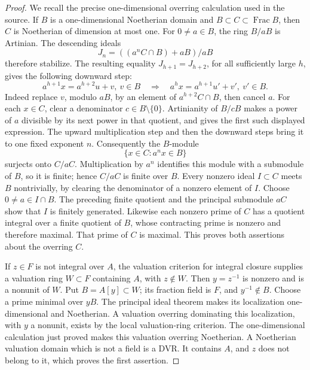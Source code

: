 \begin{proof}
We recall the precise one-dimensional overring calculation
used in the source.
If \(B\) is a one-dimensional Noetherian domain and
\(B\subset C\subset\operatorname{Frac}B\), then \(C\) is
Noetherian of dimension at most one.
For \(0\ne a\in B\), the ring \(B/aB\) is Artinian.
The descending ideals
\[
                    J_n=((a^nC\cap B)+aB)/aB
\]
therefore stabilize.
The resulting equality \(J_{h+1}=J_{h+2}\), for all
sufficiently large \(h\), gives the following downward
step:
\[
 a^{h+1}x=a^{h+2}u+v,\ v\in B
       \quad\Longrightarrow\quad
 a^hx=a^{h+1}u'+v',\ v'\in B.
\]
Indeed replace \(v\), modulo \(aB\), by an element of
\(a^{h+2}C\cap B\), then cancel \(a\).
For each \(x\in C\), clear a denominator \(c\in B\setminus\{0\}\).
Artinianity of \(B/cB\) makes a power of \(a\) divisible
by its next power in that quotient, and gives the first
such displayed expression.
The upward multiplication step and then the downward
steps bring it to one fixed exponent \(n\).
Consequently the \(B\)-module
\[
                        \{x\in C:a^nx\in B\}
\]
surjects onto \(C/aC\).
Multiplication by \(a^n\) identifies this module with a
submodule of \(B\), so it is finite; hence \(C/aC\) is
finite over \(B\).
Every nonzero ideal \(I\subset C\) meets \(B\) nontrivially,
by clearing the denominator of a nonzero element of \(I\).
Choose \(0\ne a\in I\cap B\).
The preceding finite quotient and the principal submodule
\(aC\) show that \(I\) is finitely generated.
Likewise each nonzero prime of \(C\) has a quotient integral
over a finite quotient of \(B\), whose contracting prime
is nonzero and therefore maximal.
That prime of \(C\) is maximal.
This proves both assertions about the overring \(C\).

If \(z\in F\) is not integral over \(A\), the valuation
criterion for integral closure supplies a valuation ring
\(W\subset F\) containing \(A\), with \(z\notin W\).
Then \(y=z^{-1}\) is nonzero and is a nonunit of \(W\).
Put \(B=A[y]\subset W\); its fraction field is \(F\),
and \(y^{-1}\notin B\).
Choose a prime minimal over \(yB\).
The principal ideal theorem makes its localization
one-dimensional and Noetherian.
A valuation overring dominating this localization, with
\(y\) a nonunit, exists by the local valuation-ring
criterion.
The one-dimensional calculation just proved makes this
valuation overring Noetherian.
A Noetherian valuation domain which is not a field is a
DVR.  It contains \(A\), and \(z\) does not belong to it,
which proves the first assertion.


\end{proof}

